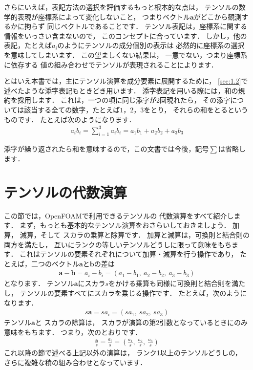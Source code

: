さらにいえば，表記方法の選択を評価するもっと根本的な点は，
テンソルの数学的表現が座標系によって変化しないこと，
つまりベクトル$\bm{a}$がどこから観測するかに拘らず
同じベクトルであることです．
テンソル表記は，座標系に関する情報をいっさい含まないので，
このコンセプトに合っています．
しかし，他の表記，たとえば$a_{i}$のようにテンソルの成分個別の表示は
必然的に座標系の選択を意味してしまいます．
この望ましくない結果は，
一意でない，つまり座標系に依存する
値の組み合わせでテンソルが表現されることによります．

とはいえ本書では，主にテンソル演算を成分要素に展開するために，
\autoref{sec:1.2}で述べたような添字表記もときどき用います．
添字表記を用いる際には，和の規約を採用します．
これは，一つの項に同じ添字が2回現れたら，
その添字については該当する全ての数字，たとえば$1$，$2$，$3$をとり，
それらの和をとるというものです．
たとえば次のようになります．
\begin{align}
 \label{eq:1.3}
 a_{i}b_{i} = \sum^{3}_{i=1}a_{i}b_{i} = a_{1}b_{1} + a_{2}b_{2} + a_{3}b_{3}
\end{align}

添字が繰り返されたら和を意味するので，この文書では今後，記号$\sum$は省略します．



\section{テンソルの代数演算}
\label{sec:1.3}
この節では，OpenFOAMで利用できるテンソルの
%
代数演算をすべて紹介します．
まず，もっとも基本的なテンソル演算をおさらいしておきましょう．
%
加算，
%
減算，そして
%
スカラの乗算と除算です．
加算と減算は，可換則と結合則の両方を満たし，
互いにランクの等しいテンソルどうしに限って意味をもちます．
これはテンソルの要素それぞれについて加算・減算を行う操作であり，
たとえば，二つのベクトル$\bm{a}$と$\bm{b}$の差は
\begin{align}
 \label{eq:1.4}
 \bm{a} - \bm{b} = a_{i} - b_{i} = (a_{1} - b_{1},\ a_{2} - b_{2},\ a_{3} - b_{3})
\end{align}
となります．
テンソル$\bm{a}$にスカラ$s$をかける乗算も同様に可換則と結合則を満たし，
テンソルの要素すべてにスカラを乗じる操作です．
たとえば，次のようになります．
\begin{align}
 \label{eq:1.5}
 s\bm{a} = sa_{i} = (sa_{1},\ sa_{2},\ sa_{3})
\end{align}
テンソル$\bm{a}$と
%
スカラの除算は，
スカラが演算の第2引数となっているときにのみ意味をもちます．
つまり，次のとおりです．
\begin{align}
 \label{eq:1.6}
 \frac{\bm{a}}{s} = \frac{a_{i}}{s}
 = \left(\frac{a_{1}}{s},\ \frac{a_{2}}{s},\ \frac{a_{3}}{s}\right)
\end{align}
これ以降の節で述べる上記以外の演算は，
ランク1以上のテンソルどうしの，
さらに複雑な積の組み合わせとなっています．


